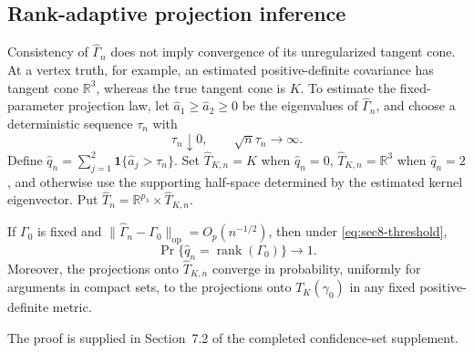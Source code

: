 \subsection{Rank-adaptive projection inference}
\label{subsec:ci-rank-adaptive}

Consistency of $\widehat\Gamma_n$ does not imply convergence of its
unregularized tangent cone. At a vertex truth, for example, an estimated
positive-definite covariance has tangent cone $\mathbb R^3$, whereas
the true tangent cone is $K$. To estimate the fixed-parameter projection
law, let $\widehat a_1\ge\widehat a_2\ge0$ be the eigenvalues of
$\widehat\Gamma_n$, and choose a deterministic sequence $\tau_n$ with
\begin{equation}\label{eq:sec8-threshold}
\tau_n\downarrow0,\qquad\sqrt n\tau_n\longrightarrow\infty.
\end{equation}
Define $\widehat q_n=\sum_{j=1}^2\mathbf1\{\widehat a_j>\tau_n\}$.
Set $\widehat T_{K,n}=K$ when $\widehat q_n=0$,
$\widehat T_{K,n}=\mathbb R^3$ when $\widehat q_n=2$,
and otherwise use the supporting half-space determined by the
estimated kernel eigenvector. Put
$\widehat T_n=\mathbb R^{p_\lambda}\times\widehat T_{K,n}$.

\begin{proposition}
\label{prop:sec8-rank-recovery}
If $\Gamma_0$ is fixed and
$\|\widehat\Gamma_n-\Gamma_0\|_{\mathrm{op}}=O_p(n^{-1/2})$,
then under \eqref{eq:sec8-threshold},
\begin{equation}\label{eq:sec8-rank-recovery}
\Pr\{\widehat q_n=\operatorname{rank}(\Gamma_0)\}\longrightarrow1.
\end{equation}
Moreover, the projections onto $\widehat T_{K,n}$ converge in
probability, uniformly for arguments in compact sets, to the
projections onto $T_K(\gamma_0)$ in any fixed positive-definite metric.
\end{proposition}

The proof is supplied in Section~7.2 of the completed confidence-set supplement.


